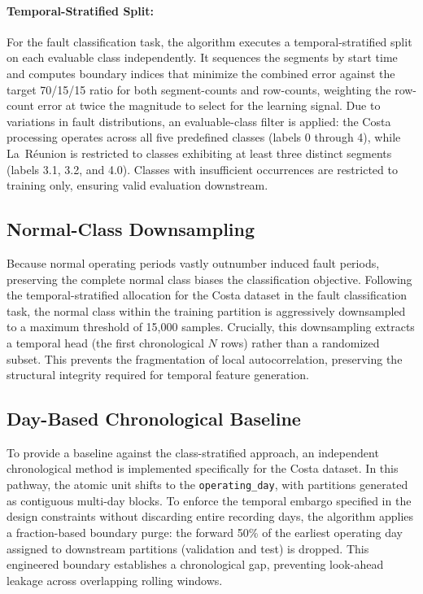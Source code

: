 \paragraph{Temporal-Stratified Split:}
For the fault classification task, the algorithm executes a temporal-stratified split on each evaluable class independently. It sequences the segments by start time and computes boundary indices that minimize the combined error against the target 70/15/15 ratio for both segment-counts and row-counts, weighting the row-count error at twice the magnitude to select for the learning signal. 
Due to variations in fault distributions, an evaluable-class filter is applied: the Costa processing operates across all five predefined classes (labels 0 through 4), while La~Réunion is restricted to classes exhibiting at least three distinct segments (labels 3.1, 3.2, and 4.0). Classes with insufficient occurrences are restricted to training only, ensuring valid evaluation downstream.

\subsection{Normal-Class Downsampling}
Because normal operating periods vastly outnumber induced fault periods, preserving the complete normal class biases the classification objective. Following the temporal-stratified allocation for the Costa dataset in the fault classification task, the normal class within the training partition is aggressively downsampled to a maximum threshold of 15,000 samples. Crucially, this downsampling extracts a temporal head (the first chronological $N$ rows) rather than a randomized subset. This prevents the fragmentation of local autocorrelation, preserving the structural integrity required for temporal feature generation.

\subsection{Day-Based Chronological Baseline}
To provide a baseline against the class-stratified approach, an independent chronological method is implemented specifically for the Costa dataset. In this pathway, the atomic unit shifts to the \texttt{operating\_day}, with partitions generated as contiguous multi-day blocks. To enforce the temporal embargo specified in the design constraints without discarding entire recording days, the algorithm applies a fraction-based boundary purge: the forward 50\% of the earliest operating day assigned to downstream partitions (validation and test) is dropped. This engineered boundary establishes a chronological gap, preventing look-ahead leakage across overlapping rolling windows.

